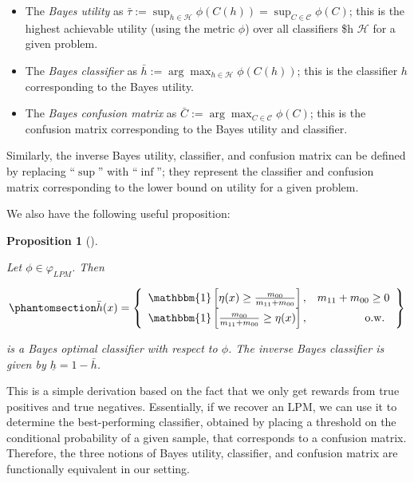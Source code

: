 \documentclass[
  letterpaper,
  numbers=noenddot,
  DIV=11]{scrreprt}
\providecommand{\tightlist}{%
  \setlength{\itemsep}{0pt}\setlength{\parskip}{0pt}}\usepackage{longtable,booktabs,array}
\theoremstyle{definition}
\theoremstyle{plain}
\newtheorem{proposition}{Proposition}[chapter]
\theoremstyle{plain}
\theoremstyle{remark}
\begin{document}
\begin{itemize}
\tightlist
\item
  The \emph{Bayes utility} as
  \(\bar{\tau} := \sup_{h \in \mathcal{H}} \phi(C(h)) = \sup_{C \in \mathcal{C}} \phi(C)\);
  this is the highest achievable utility (using the metric \(\phi\))
  over all classifiers \$h \in \(\mathcal{H}\) for a given problem.
\item
  The \emph{Bayes classifier} as
  \(\bar{h} := \arg \max_{h \in \mathcal{H}} \phi(C(h))\); this is the
  classifier \(h\) corresponding to the Bayes utility.
\item
  The \emph{Bayes confusion matrix} as
  \(\bar{C} := \arg \max_{C \in \mathcal{C}} \phi(C)\); this is the
  confusion matrix corresponding to the Bayes utility and classifier.
\end{itemize}

Similarly, the inverse Bayes utility, classifier, and confusion matrix
can be defined by replacing ``\(\sup\)'' with ``\(\inf\)''; they
represent the classifier and confusion matrix corresponding to the lower
bound on utility for a given problem.

We also have the following useful proposition:

\begin{tcolorbox}[colframe=.grey, title=\faPenSquare \enspace Proposition]

\begin{proposition}[]\protect\hypertarget{prp-prp3.1}{}\label{prp-prp3.1}

Let \(\phi \in \varphi_{LPM}\). Then

\begin{equation}\phantomsection\label{eq-eq3.46}{\bar{h}(x) = \left\{\begin{array}{lr}
\mathbbm{1}\left[\eta(x) \geq \frac{m_{00}}{m_{11} + m_{00}}\right], & m_{11} + m_{00} \geq 0 \\
\mathbbm{1}\left[\frac{m_{00}}{m_{11} + m_{00}} \geq \eta(x)\right], & \text { o.w. }
\end{array}\right\}}\end{equation}

is a Bayes optimal classifier with respect to \(\phi\). The inverse
Bayes classifier is given by \(\underline{h} = 1 - \bar{h}\).

\end{proposition}

\end{tcolorbox}

This is a simple derivation based on the fact that we only get rewards
from true positives and true negatives. Essentially, if we recover an
LPM, we can use it to determine the best-performing classifier, obtained
by placing a threshold on the conditional probability of a given sample,
that corresponds to a confusion matrix. Therefore, the three notions of
Bayes utility, classifier, and confusion matrix are functionally
equivalent in our setting.
\end{document}
